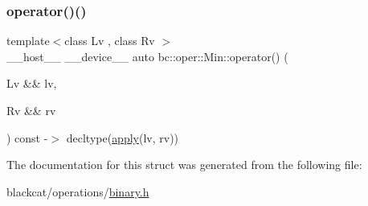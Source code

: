 \mbox{\label{structbc_1_1oper_1_1Min_a1cb6ace7faa8b791d3ee2ae40c61dd7b}} 
\subsubsection{\texorpdfstring{operator()()}{operator()()}}
{\footnotesize\ttfamily template$<$class Lv , class Rv $>$ \\
\+\_\+\+\_\+host\+\_\+\+\_\+ \+\_\+\+\_\+device\+\_\+\+\_\+ auto bc\+::oper\+::\+Min\+::operator() (\begin{DoxyParamCaption}\item[{Lv \&\&}]{lv,  }\item[{Rv \&\&}]{rv }\end{DoxyParamCaption}) const -\/$>$ decltype(\hyperlink{structbc_1_1oper_1_1Min_abf39f4a93eff4b1a318265f4e9661b02}{apply}(lv, rv)) \hspace{0.3cm}{\ttfamily [inline]}}



The documentation for this struct was generated from the following file\+:\begin{DoxyCompactItemize}
\item 
blackcat/operations/\hyperlink{binary_8h}{binary.\+h}\end{DoxyCompactItemize}
